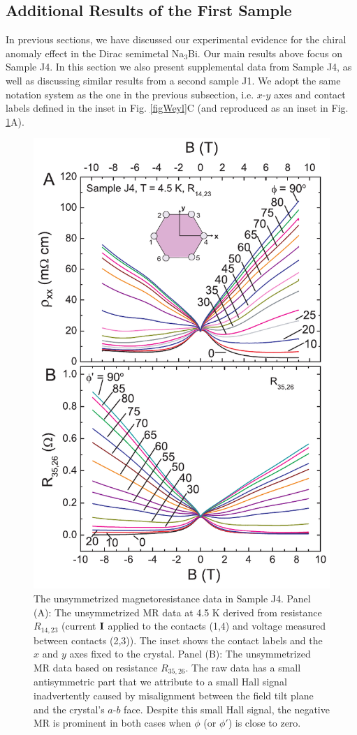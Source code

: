 \subsection{Additional Results of the First Sample}

In previous sections, we have discussed our experimental evidence for the chiral anomaly effect in the Dirac semimetal Na$_3$Bi. Our main results above focus on Sample J4. In this section we also present supplemental data from Sample J4, as well as discussing similar results from a second sample J1. We adopt the same notation system as the one in the previous subsection, i.e. $x$-$y$ axes and contact labels defined in the inset in Fig. \ref{figWeyl}C (and reproduced as an inset in Fig. \ref{J4Raw}A). 
\begin{figure}[!htbp]
  \begin{center}
\includegraphics[width=0.75\linewidth]{ch-na3bi/figures/FigJ4RawMR.pdf}
\caption{\label{J4Raw} The unsymmetrized magnetoresistance data in Sample J4. Panel (A): The unsymmetrized MR data at 4.5 K derived from resistance $R_{14,23}$ (current $\bf{I}$ applied to the contacts (1,4) and voltage measured between contacts (2,3)). The inset shows the contact labels and the $x$ and $y$ axes fixed to the crystal. Panel (B): The unsymmetrized MR data based on resistance $R_{35,26}$. The raw data has a small antisymmetric part that we attribute to a small Hall signal inadvertently caused by misalignment between the field tilt plane and the crystal's $a$-$b$ face. Despite this small Hall signal, the negative MR is prominent in both cases when $\phi$ (or $\phi'$) is close to zero.}
  \end{center}
\end{figure}

